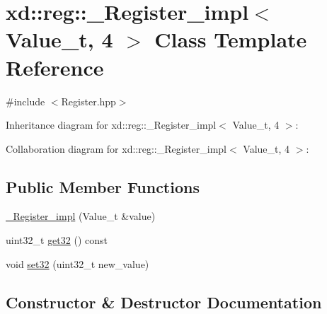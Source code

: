 \hypertarget{classxd_1_1reg_1_1___register__impl_3_01_value__t_00_014_01_4}{}\section{xd\+:\+:reg\+:\+:\+\_\+\+Register\+\_\+impl$<$ Value\+\_\+t, 4 $>$ Class Template Reference}
\label{classxd_1_1reg_1_1___register__impl_3_01_value__t_00_014_01_4}


{\ttfamily \#include $<$Register.\+hpp$>$}



Inheritance diagram for xd\+:\+:reg\+:\+:\+\_\+\+Register\+\_\+impl$<$ Value\+\_\+t, 4 $>$\+:


Collaboration diagram for xd\+:\+:reg\+:\+:\+\_\+\+Register\+\_\+impl$<$ Value\+\_\+t, 4 $>$\+:
\subsection*{Public Member Functions}
\begin{DoxyCompactItemize}
\item 
\mbox{\hyperlink{classxd_1_1reg_1_1___register__impl_3_01_value__t_00_014_01_4_afa957c323870b64fa4a852256727d9ea}{\+\_\+\+Register\+\_\+impl}} (Value\+\_\+t \&value)
\item 
uint32\+\_\+t \mbox{\hyperlink{classxd_1_1reg_1_1___register__impl_3_01_value__t_00_014_01_4_ad426ab81dc90ee53e7aba15abee8c99b}{get32}} () const
\item 
void \mbox{\hyperlink{classxd_1_1reg_1_1___register__impl_3_01_value__t_00_014_01_4_a197fbb04c1a39015c8f361a75f410bed}{set32}} (uint32\+\_\+t new\+\_\+value)
\end{DoxyCompactItemize}


\subsection{Constructor \& Destructor Documentation}
\mbox{\label{classxd_1_1reg_1_1___register__impl_3_01_value__t_00_014_01_4_afa957c323870b64fa4a852256727d9ea}} 
